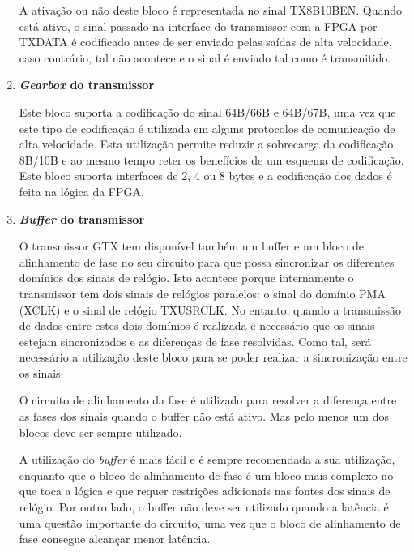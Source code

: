 \begin{enumerate}
	\hspace{1.0em}A ativação ou não deste bloco é representada no sinal TX8B10BEN. Quando está ativo, o sinal passado na interface do transmissor com a FPGA por TXDATA é codificado antes de ser enviado pelas saídas de alta velocidade, caso contrário, tal não acontece e o sinal é enviado tal como é transmitido. 
	
	\item \textbf{\textit{Gearbox} do transmissor}
	
	\hspace{1.0em}Este bloco suporta a codificação do sinal 64B/66B e 64B/67B, uma vez que este tipo de codificação é utilizada em alguns protocolos de comunicação de alta velocidade. Esta utilização permite reduzir a sobrecarga da codificação 8B/10B e ao mesmo tempo reter os benefícios de um esquema de codificação. Este bloco suporta interfaces de 2, 4 ou 8 bytes e a codificação dos dados é feita na lógica da FPGA. 
	
	\item \textbf{\textit{Buffer} do transmissor}
	
	\hspace{1.0em}O transmissor GTX tem disponível também um buffer e um bloco de alinhamento de fase no seu circuito para que possa sincronizar os diferentes domínios dos sinais de relógio. Isto acontece porque internamente o transmissor tem dois sinais de relógios paralelos: o sinal do domínio PMA (XCLK) e o sinal de relógio TXUSRCLK. No entanto, quando a transmissão de dados entre estes dois domínios é realizada é necessário que os sinais estejam sincronizados e as diferenças de fase resolvidas. Como tal, será necessário a utilização deste bloco para se poder realizar a sincronização entre os sinais.
	
	\hspace{1.0em}O circuito de alinhamento da fase é utilizado para resolver a diferença entre as fases dos sinais quando o buffer não está ativo. Mas pelo menos um dos blocos deve ser sempre utilizado. 
	
	\hspace{1.0em}A utilização do \textit{buffer} é mais fácil e é sempre recomendada a sua utilização, enquanto que o bloco de alinhamento de fase é um bloco mais complexo no que toca a lógica e que requer restrições adicionais nas fontes dos sinais de relógio. Por outro lado, o buffer não deve ser utilizado quando a latência é uma questão importante do circuito, uma vez que o bloco de alinhamento de fase consegue alcançar menor latência. 
	

\end{enumerate}
